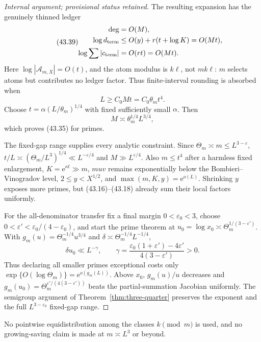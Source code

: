 \documentclass[10pt,reqno]{amsart}
\theoremstyle{definition}
\newcommand{\e}{\mathrm e}
\newcommand{\1}{\mathbf 1}
\newcommand{\eps}{\varepsilon}
\begin{document}
\begin{proof}[Internal argument; provisional status retained]
The resulting expansion has the genuinely thinned ledger
\begin{equation}\tag{43.39}
 \begin{aligned}
 \deg&=O(M),\\
 \log d_{\rm term}&\leq O(y)+r(t+\log K)=O(Mt),\\
 \log\sum|c_{\rm term}|&=O(rt)=O(Mt).
 \end{aligned}
\end{equation}
Here $\log|\mathcal A_{m,X}|=O(t)$, and the atom modulus is $k\ell$, not
$mk\ell$: $m$ selects atoms but contributes no ledger factor.  Thus
finite-interval rounding is absorbed when
\begin{equation}\tag{43.40}
                         L\geq C_0Mt=C_0\theta_mt^4.
\end{equation}
Choose $t=\alpha(L/\theta_m)^{1/4}$ with fixed sufficiently small $\alpha$.
Then
\begin{equation}\tag{43.41}
                         M\asymp\theta_m^{1/4}L^{3/4},
\end{equation}
which proves (43.35) for primes.

The fixed-gap range supplies every analytic constraint.  Since
$\Theta_m\asymp m\leq L^{3-\eps}$,
$t/L\asymp(\Theta_m/L^3)^{1/4}\ll L^{-\eps/4}$ and
$M\gg L^{\eps/4}$.  Also $m\leq t^4$ after a harmless fixed enlargement,
$K=\e^{\kappa t}\gg m$, $muv$ remains exponentially below the
Bombieri--Vinogradov level, $2\leq y<X^{1/2}$, and
$\max(m,K,y)=\e^{o(L)}$.  Shrinking $y$ exposes more primes, but
(43.16)--(43.18) already sum their local factors uniformly.

For the all-denominator transfer fix a final margin $0<\eps_0<3$, choose
$0<\eps'<\eps_0/(4-\eps_0)$, and start the prime theorem at
$u_0=\log x_0\asymp\Theta_m^{1/(3-\eps')}$.  With
$g_m(u)=\Theta_m^{-1/4}u^{3/4}$ and
$\delta\asymp\Theta_m^{-1/4}L^{-1/4}$,
\begin{equation}\tag{43.42}
 \delta u_0\ll L^{-\gamma},\qquad
 \gamma=\frac{\eps_0(1+\eps')-4\eps'}{4(3-\eps')}>0.
\end{equation}
Thus declaring all smaller primes exceptional costs only
$\exp\{O(\log\Theta_m)\}=\e^{o(g_m(L))}$.  Above $x_0$,
$g_m(u)/u$ decreases and
$g_m(u_0)=\Theta_m^{\eps'/(4(3-\eps'))}$ beats the partial-summation
Jacobian uniformly.  The semigroup argument of
Theorem~\ref{thm:three-quarter} preserves the exponent and the full
$L^{3-\eps_0}$ fixed-gap range.
\end{proof}
No pointwise equidistribution among the classes $k\pmod m$ is used, and no
growing-saving claim is made at $m\asymp L^3$ or beyond.
\end{document}
